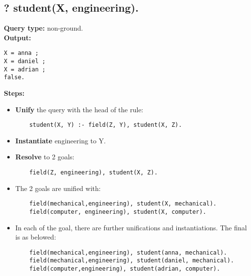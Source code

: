 \newpage
\subsection{? student(X, engineering).}
\textbf{Query type: } non-ground. \\
\textbf{Output:} 
\begin{lstlisting}
X = anna ; 
X = daniel ; 
X = adrian ; 
false. 
\end{lstlisting}

\textbf{Steps:}
\begin{itemize}
    \item \textbf{Unify} the query with the head of the rule:
    \begin{lstlisting}
    student(X, Y) :- field(Z, Y), student(X, Z).
    \end{lstlisting}
    \item \textbf{Instantiate} engineering to Y.
    \item \textbf{Resolve} to 2 goals:
    \begin{lstlisting}
    field(Z, engineering), student(X, Z).
    \end{lstlisting}
    \item The 2 goals are unified with:
    \begin{lstlisting}
    field(mechanical,engineering), student(X, mechanical).
    field(computer, engineering), student(X, computer).
    \end{lstlisting}
    \item In each of the goal, there are further unifications and instantiations. The final is as belowed:
    \begin{lstlisting}
    field(mechanical,engineering), student(anna, mechanical).
    field(mechanical,engineering), student(daniel, mechanical).
    field(computer,engineering), student(adrian, computer).
    \end{lstlisting}
\end{itemize}

